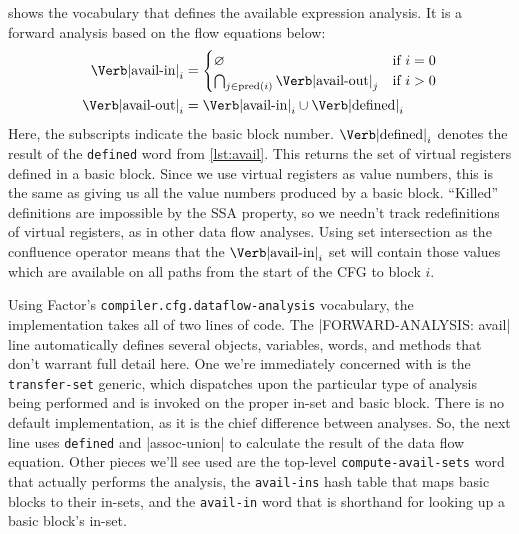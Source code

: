  shows the vocabulary that defines the available expression
analysis.  It is a forward analysis \autocite[see][]{DragonBook} based on the
flow equations below:
\begin{align*}
  \text{\Verb|avail-in|}_i &=
    \begin{cases}
      \varnothing
        & \text{if $i=0$} \\
      \bigcap_{j\in\mathrm{pred}(i)}\text{\Verb|avail-out|}_j
        & \text{if $i>0$}
    \end{cases} \\
  \text{\Verb|avail-out|}_i &= \text{\Verb|avail-in|}_i
                                 \cup 
                                 \text{\Verb|defined|}_i
\end{align*}
%
\noindent Here, the subscripts indicate the basic block number.
$\text{\Verb|defined|}_i$ denotes the result of the \Verb|defined| word from
\vref{lst:avail}.  This returns the set of virtual registers defined in a basic
block.  Since we use virtual registers as value numbers, this is the same as
giving us all the value numbers produced by a basic block.  ``Killed''
definitions are impossible by the \gls{SSA} property, so we needn't track
redefinitions of virtual registers, as in other data flow analyses.  Using set
intersection as the confluence operator means that the
$\text{\Verb|avail-in|}_i$ set will contain those values which are available on
all paths from the start of the \gls{CFG} to block $i$.


\begin{sloppypar}
Using Factor's \Verb|compiler.cfg.dataflow-analysis| vocabulary, the
implementation takes all of two lines of code.  The
%
\factor|FORWARD-ANALYSIS: avail|
%
line automatically defines several objects, variables, words, and methods that
don't warrant full detail here.  One we're immediately concerned with is the
\Verb|transfer-set| generic, which dispatches upon the particular type of
analysis being performed and is invoked on the proper in-set and basic block.
There is no default implementation, as it is the chief difference between
analyses.  So, the next line uses \Verb|defined| and \factor|assoc-union| to
calculate the result of the data flow equation.  Other pieces we'll see used
are the top-level \Verb|compute-avail-sets| word that actually performs the
analysis, the \Verb|avail-ins| hash table that maps basic blocks to their
in-sets, and the \Verb|avail-in| word that is shorthand for looking up a
basic block's in-set.
\end{sloppypar}

